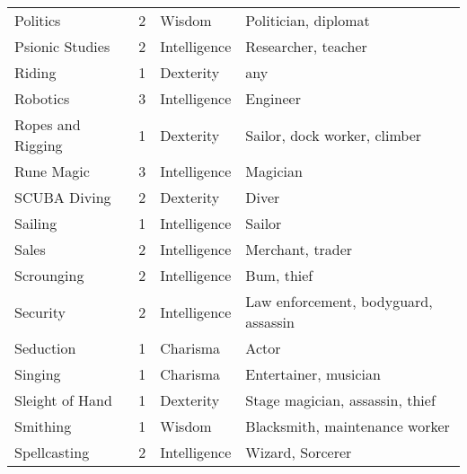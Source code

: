 \documentclass[twoside]{book}
\begin{document}
\begin{longtable}{p{1.25in}llp{12em}}
  \raggedright
           Politics 
  &
   2 
  &
   Wisdom 
  &
   Politician, diplomat
           
  \tabularnewline
      
  \raggedright
           Psionic Studies 
  &
   2 
  &
   Intelligence 
  &
   Researcher, teacher
           
  \tabularnewline
      
  \raggedright
           Riding 
  &
   1 
  &
   Dexterity 
  &
   any 
  \tabularnewline
      
  \raggedright
           Robotics 
  &
   3 
  &
   Intelligence 
  &
   Engineer 
  \tabularnewline
      
  \raggedright
           Ropes and Rigging 
  &
   1 
  &
   Dexterity 
  &
   Sailor, dock worker,
           climber 
  \tabularnewline
      
  \raggedright
           Rune Magic 
  &
   3 
  &
   Intelligence 
  &
   Magician 
  \tabularnewline
      
  \raggedright
           SCUBA Diving 
  &
   2 
  &
   Dexterity 
  &
   Diver 
  \tabularnewline
      
  \raggedright
           Sailing 
  &
   1 
  &
   Intelligence 
  &
   Sailor 
  \tabularnewline
      
  \raggedright
           Sales 
  &
   2 
  &
   Intelligence 
  &
   Merchant, trader 
  \tabularnewline
      
  \raggedright
           Scrounging 
  &
   2 
  &
   Intelligence 
  &
   Bum, thief 
  \tabularnewline
      
  \raggedright
           Security 
  &
   2 
  &
   Intelligence 
  &
   Law enforcement,
           bodyguard, assassin 
  \tabularnewline
      
  \raggedright
           Seduction 
  &
   1 
  &
   Charisma 
  &
   Actor 
  \tabularnewline
      
  \raggedright
           Singing 
  &
   1 
  &
   Charisma 
  &
   Entertainer, musician
           
  \tabularnewline
      
  \raggedright
           Sleight of Hand 
  &
   1 
  &
   Dexterity 
  &
   Stage magician, assassin,
           thief 
  \tabularnewline
      
  \raggedright
           Smithing 
  &
   1 
  &
   Wisdom 
  &
   Blacksmith, maintenance
           worker 
  \tabularnewline
      
  \raggedright
           Spellcasting 
  &
   2 
  &
   Intelligence 
  &
   Wizard, Sorcerer 
  \tabularnewline
      

\end{longtable}
\end{document}
